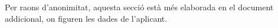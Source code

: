 \documentclass[final,10pt]{article}
\begin{document}
Per raons d'anonimitat, aquesta secci\'o est\`a m\'es elaborada en el document addicional, on figuren les dades de l'aplicant.

%
%
%
\newpage


\end{document}
